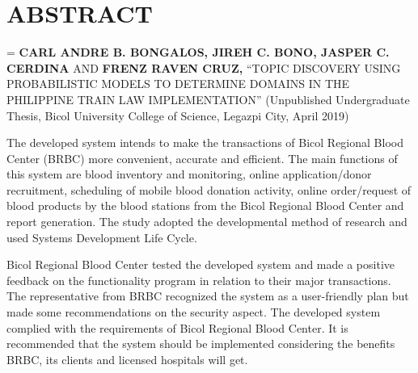     \section{ABSTRACT}



\begin{spacing}{1}
\hangindent=\parindent
{}
\noindent \textbf {CARL ANDRE B. BONGALOS, JIREH C. BONO, JASPER C. CERDINA} AND \textbf{FRENZ RAVEN CRUZ,} “TOPIC DISCOVERY USING PROBABILISTIC MODELS TO DETERMINE DOMAINS IN THE PHILIPPINE TRAIN LAW IMPLEMENTATION” (Unpublished Undergraduate Thesis, Bicol University College of Science, Legazpi City, April 2019)
\end{spacing}


The developed system intends to make the transactions of Bicol Regional Blood Center (BRBC) more convenient, accurate and efficient.  The main functions of this system are blood inventory and monitoring, online application/donor recruitment, scheduling of mobile blood donation activity,  online order/request of blood products by the blood stations from the Bicol Regional Blood Center and report generation.  The study adopted the developmental method of research and used Systems Development Life Cycle.

Bicol Regional Blood Center tested the developed system and made a positive feedback on the functionality program in relation to their major transactions.  The representative from BRBC recognized the system as a user-friendly plan but made some recommendations on the security aspect.
The developed system complied with the requirements of Bicol Regional Blood Center.  It is recommended that the system should be implemented considering the benefits BRBC, its clients and licensed hospitals will get.

